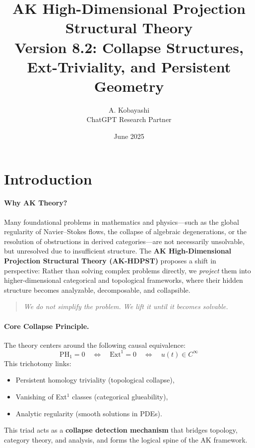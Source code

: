 \documentclass[11pt]{article}
\title{AK High-Dimensional Projection Structural Theory\\
\Large Version 8.2: Collapse Structures, Ext-Triviality, and Persistent Geometry}
\author{A. Kobayashi \\ \small ChatGPT Research Partner}
\date{June 2025}
\begin{document}
\maketitle

\tableofcontents
\newpage

\section{Introduction}

\paragraph{Why AK Theory?}
Many foundational problems in mathematics and physics—such as the global regularity of Navier–Stokes flows, the collapse of algebraic degenerations, or the resolution of obstructions in derived categories—are not necessarily unsolvable, but unresolved due to insufficient structure.  
The \textbf{AK High-Dimensional Projection Structural Theory (AK-HDPST)} proposes a shift in perspective:  
Rather than solving complex problems directly, we \emph{project} them into higher-dimensional categorical and topological frameworks, where their hidden structure becomes analyzable, decomposable, and collapsible.

\begin{quote}
\emph{We do not simplify the problem. We lift it until it becomes solvable.}
\end{quote}

\paragraph{Core Collapse Principle.}
The theory centers around the following causal equivalence:
\[
\mathrm{PH}_1 = 0 \quad \Leftrightarrow \quad \mathrm{Ext}^1 = 0 \quad \Leftrightarrow \quad u(t) \in C^\infty
\]
This trichotomy links:
\begin{itemize}
  \item Persistent homology triviality (topological collapse),
  \item Vanishing of Ext$^1$ classes (categorical glueability),
  \item Analytic regularity (smooth solutions in PDEs).
\end{itemize}
This triad acts as a \textbf{collapse detection mechanism} that bridges topology, category theory, and analysis, and forms the logical spine of the AK framework.
\end{document}
